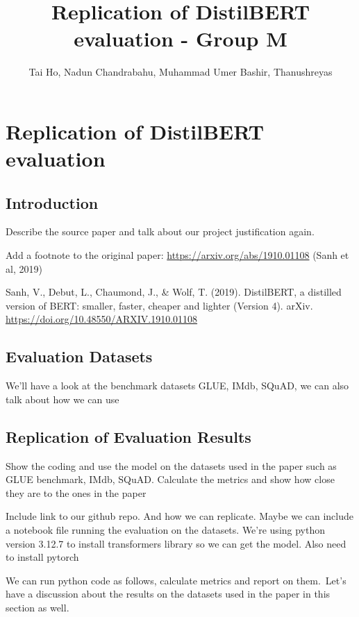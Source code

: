 \documentclass[
  11pt,
]{article}
\title{Replication of DistilBERT evaluation - Group M}
\author{Tai Ho, Nadun Chandrabahu, Muhammad Umer Bashir, Thanushreyas}
\date{}
\begin{document}
\maketitle

\section{Replication of DistilBERT
evaluation}\label{replication-of-distilbert-evaluation}

\subsection{Introduction}\label{introduction}

Describe the source paper and talk about our project justification
again.

Add a footnote to the original paper:
\url{https://arxiv.org/abs/1910.01108} (Sanh et al, 2019)

Sanh, V., Debut, L., Chaumond, J., \& Wolf, T. (2019). DistilBERT, a
distilled version of BERT: smaller, faster, cheaper and lighter (Version
4). arXiv. \url{https://doi.org/10.48550/ARXIV.1910.01108}

\subsection{Evaluation Datasets}\label{evaluation-datasets}

We'll have a look at the benchmark datasets GLUE, IMdb, SQuAD, we can
also talk about how we can use

\subsection{Replication of Evaluation
Results}\label{replication-of-evaluation-results}

Show the coding and use the model on the datasets used in the paper such
as GLUE benchmark, IMdb, SQuAD. Calculate the metrics and show how close
they are to the ones in the paper

Include link to our github repo. And how we can replicate. Maybe we can
include a notebook file running the evaluation on the datasets. We're
using python version 3.12.7 to install transformers library so we can
get the model. Also need to install pytorch

We can run python code as follows, calculate metrics and report on
them.~Let's have a discussion about the results on the datasets used in
the paper in this section as well.
\end{document}
